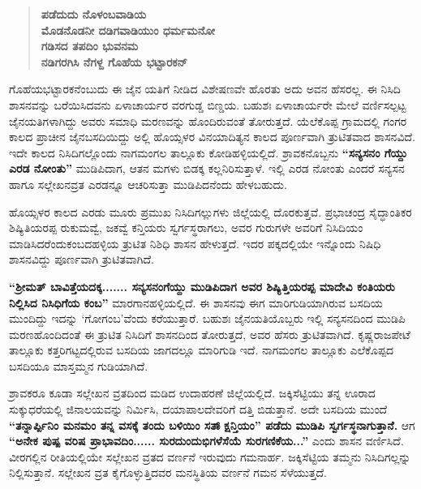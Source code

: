 \begin{verse}
\textbf{ಪಡೆದುದು ನೊಳಂಬವಾಡಿಯ} \\\textbf{ಮೊಡನೊಡನೀ ದಡಿಗವಾಡಿಯುಂ ಧರ್ಮಮನೋ} \\\textbf{ಗಡಿಸದ ತಪದಿಂ ಭುವನಮ} \\\textbf{ನಡಿಗರಗಿಸಿ ನೆಗಳ್ದ ಗೊಹೆಯ ಭಟ್ಟಾರಕನ್​}
\end{verse}

ಗೊಹೆಯಭಟ್ಟಾರಕನೆಂಬುದು ಈ ಜೈನ ಯತಿಗೆ ನೀಡಿದ ವಿಶೇಷಣವೇ ಹೊರತು ಅದು ಅವನ ಹೆಸರಲ್ಲ. ಈ ನಿಸಿದಿ ಶಾಸನವನ್ನು ಬರೆಯಿಸಿದವನು ಏಳಾಚಾರ್ಯರ ವರಗುಡ್ಡ ಬಿಣ್ಡಯ. ಬಹುಶಃ ಏಳಾಚಾರ್ಯರೇ ಮೇಲೆ ವರ್ಣಿಸಲ್ಪಟ್ಟ ಜೈನಯತಿಗಳಾಗಿದ್ದು ಅವರು ಸಮಾಧಿ ಮರಣವನ್ನು ಹೊಂದಿರುವಂತೆ ತೋರುತ್ತದೆ. ಯೆಲೆಕೊಪ್ಪ ಗ್ರಾಮದಲ್ಲಿ ಗಂಗರ ಕಾಲದ ಪ್ರಾಚೀನ ಜೈನಬಸದಿಯಿದ್ದು ಅಲ್ಲಿ ಹೊಯ್ಸಳರ ವಿನಯಾದಿತ್ಯನ ಕಾಲದ ಪೂರ್ಣವಾಗಿ ತ್ರುಟಿತವಾದ ಶಾಸನವಿದೆ. ಇದೇ ಕಾಲದ ನಿಸಿದಿಗಲ್ಲೊಂದು ನಾಗಮಂಗಲ ತಾಲ್ಲೂಕು ಕೋಡಿಹಳ್ಳಿಯಲ್ಲಿದೆ. ಶ್ರಾವಕನೊಬ್ಬನು \textbf{“ಸನ್ಯಸನಂ ಗೆಯ್ದು ಎರಡ ನೋಂತು”} ಮುಡಿಪಿದಾಗ, ಆತನ ಮಗಳು ಬಿಡಕ್ಕ ಕಲ್ಲನಿರಿಸುತ್ತಾಳೆ. ಇಲ್ಲಿ ಎರಡ ನೋಂತು ಎಂದರೆ ಸನ್ಯಸನ ಹಾಗೂ ಸಲ್ಲೇಖನವ್ರತ ಎರಡನ್ನೂ ಆಚರಿಸುತ್ತಾ ಮುಡಿಪಿದನೆಂದು ಹೇಳಬಹುದು.

ಹೊಯ್ಸಳರ ಕಾಲದ ಎರಡು ಮೂರು ಪ್ರಮುಖ ನಿಸಿದಿಗಲ್ಲುಗಳು ಜಿಲ್ಲೆಯಲ್ಲಿ ದೊರಕುತ್ತವೆ. ಪ್ರಭಾಚಂದ್ರ ಸೈದ್ಧಾಂತಿಕರ ಶಿಷ್ಯಿತಿಯರಪ್ಪ ರುಕುಮವ್ವೆ, ಜಕವ್ವೆ ಕನ್ತಿಯರು ಸ್ವರ್ಗಸ್ಥರಾಗಲು, ಅವರ ಗುರುಗಳೇ ಅವರಿಗೆ ನಿಸಿದಿಯಂ ಮಾಡಿಸಿದರೆಂದು\break ಕಂಬದಹಳ್ಳಿಯ ತ್ರುಟಿತ ನಿಶಿಧಿ ಶಾಸನ ಹೇಳುತ್ತದೆ. ಇದರ ಪಕ್ಕದಲ್ಲಿಯೇ ಇನ್ನೊಂದು ನಿಷಿಧಿ ಶಾಸನವಿದ್ದು ಪೂರ್ಣವಾಗಿ ತ್ರುಟಿತವಾಗಿದೆ.

\textbf{“ಶ‍್ರೀಮತ್​ ಬಾವಿತ್ತೆಯದಕ್ಕ....... ಸನ್ಯಸನಂಗೆಯ್ದು ಮುಡಿಪಿದಾಗ ಅವರ ಶಿಷ್ಯಿತ್ತಿಯರಪ್ಪ ಮಾದೇವಿ ಕಂತಿಯರು ನಿಲ್ಲಿಸಿದ ನಿಸಿಧಿಗೆಯ ಕಂಬ”} ಮಾರಗಾನಹಳ್ಳಿಯಲ್ಲಿದೆ. ಈ ಶಾಸನವು ಈಗ ಮಾರಿಗುಡಿಯಾಗಿರುವ ಬಸದಿಯ ಮುಂದಿದ್ದು ಇದನ್ನು ‘ಗೋಗಂಬ’ವೆಂದು ಕರೆಯುತ್ತಾರೆ. ಬಹುಶಃ ಜೈನಯತಿಯೊಬ್ಬರು ಇಲ್ಲಿ ಸನ್ಯಸನದಿಂದ ಮುಡಿಪಿ ಮರಣಹೊಂದಿದಂತೆ ಈ ತ್ರುಟಿತ ನಿಸಿದಿಗೆ ಶಾಸನದಿಂದ ತೋರುತ್ತದೆ, ಅವರ ಹೆಸರು ತ್ರುಟಿತವಾಗಿದೆ. ಕೃಷ್ಣರಾಜಪೇಟೆ ತಾಲ್ಲೂಕು ಕತ್ತರಿಗಟ್ಟದಲ್ಲಿರುವ ಬಸದಿಯ ಜಾಗದಲ್ಲೂ ಮಾರಿಗುಡಿ ಇದೆ. ನಾಗಮಂಗಲ ತಾಲ್ಲೂಕು ಎಲೆಕೊಪ್ಪದ ಬಸದಿಯೂ ಮಾಸ್ತಮ್ಮನ ಗುಡಿಯಾಗಿದೆ.

ಶ್ರಾವಕರೂ ಕೂಡಾ ಸಲ್ಲೇಖನ ವ್ರತದಿಂದ ಮಡಿದ ಉದಾಹರಣೆ ಜಿಲ್ಲೆಯಲ್ಲಿದೆ. ಜಕ್ಕಿಸೆಟ್ಟಿಯು ತನ್ನ ಊರಾದ ಸುಕ್ಕುಧರೆಯಲ್ಲಿ ಜಿನಾಲಯವನ್ನು ನಿರ್ಮಿಸಿ, ದಯಾಪಾಲದೇವರಿಗೆ ದತ್ತಿ ಬಿಡುತ್ತಾನೆ. ಅದೇ ಬಸದಿಯ ಮುಂದೆ \textbf{“ತನ್ನಾರ್ಪ್ಪಿನಿಂ ಮನಮಂ ತನ್ನ ವಸಕ್ಕೆ ತಂದು ಬಳಿಯಿಂ ಸತ್ಕ್ಷಾನ್ತಿಯಂ” ಪಡೆದು ಮುಡಿಪಿ ಸ್ವರ್ಗಸ್ಥನಾಗುತ್ತಾನೆ.} ಆಗ \textbf{“ಅನೇಕ ಪುಷ್ಪ ವರಿಷ ಪ್ರಾಭಾವದಿಂ...... ಸುರದುಂದುಭಿಗಳೆಸೆಯೆ ಸುರಗಣಿಕೆಯ...”} ಎಂದು ಶಾಸನ ವರ್ಣಿಸಿದೆ. ವೀರಗಲ್ಲಿನ ರೀತಿಯಲ್ಲಿಯೇ ಸಲ್ಲೇಖನ ವ್ರತದ ವರ್ಣನೆ ಇರುವುದು ಗಮನಾರ್ಹ. ಜಕ್ಕಿಸೆಟ್ಟಿಯ ತಮ್ಮನು ನಿಸಿದಿಗಲ್ಲನ್ನು ನಿಲ್ಲಿಸುತ್ತಾನೆ. ಸಲ್ಲೇಖನ ವ್ರತ ಕೈಗೊಳ್ಳುತ್ತಿದವರ ಮನಸ್ಥಿತಿಯ ವರ್ಣನೆ ಗಮನ ಸೆಳೆಯುತ್ತದೆ.


